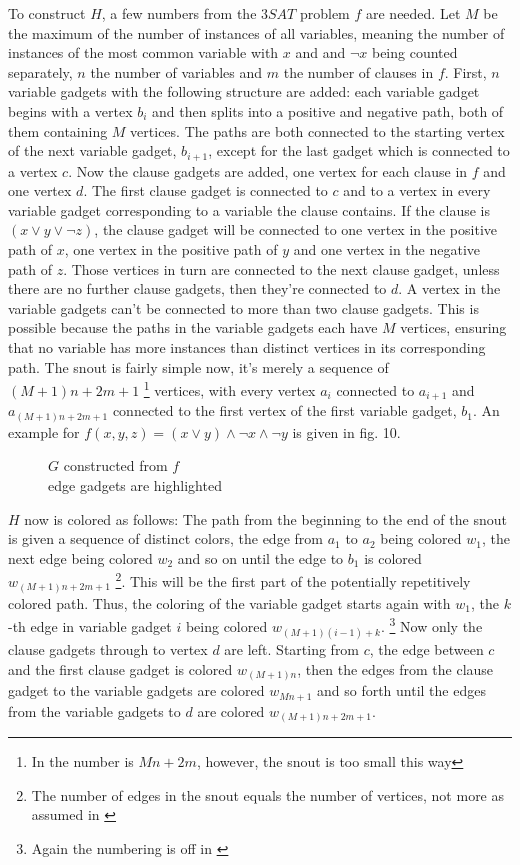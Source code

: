 \documentclass[12pt,a4paper]{article}
\begin{document}
To construct $H$, a few numbers from the $3SAT$ problem $f$ are needed. Let $M$ be the maximum of the  number of instances of all variables, meaning the number of instances of the most common variable with $x$ and and $\neg x$ being counted separately, $n$ the number of variables and $m$ the number of clauses in $f$. First, $n$ variable gadgets with the following structure are added: each variable gadget begins with a vertex $b_i$ and then splits into a positive and negative path, both of them containing $M$ vertices. The paths are both connected to the starting vertex of the next variable gadget, $b_{i+1}$, except for the last gadget which is connected to a vertex $c$. Now the clause gadgets are added, one vertex for each clause in $f$ and one vertex $d$. The first clause gadget is connected to $c$ and to a vertex in every variable gadget corresponding to a variable the clause contains. If the clause is $(x \vee y \vee \neg z)$, the clause gadget will be connected to one vertex in the positive path of $x$, one vertex in the positive path of $y$ and one vertex in the negative path of $z$. Those vertices in turn are connected to the next clause gadget, unless there are no further clause gadgets, then they're connected to $d$. A vertex in the variable gadgets can't be connected to more than two clause gadgets. This is possible because the paths in the variable gadgets each have $M$ vertices, ensuring that no variable has more instances than distinct vertices in its corresponding path. The snout is fairly simple now, it's merely a sequence of $(M+1)n+2m+1$ \footnote{In \citep{Manin2008} the number is $Mn+2m$, however, the snout is too small this way} vertices, with every vertex $a_i$ connected to $a_{i+1}$ and $a_{(M+1)n+2m+1}$ connected to the first  vertex of the first variable gadget, $b_1$. An example for $f(x, y, z) = (x \vee y) \wedge \neg x \wedge \neg y$ is given in fig. 10. 
\begin{figure}[h]
	
	\caption{$G$ constructed from $f$ \\edge gadgets are highlighted}
\end{figure}
\newline	
$H$ now is colored as follows: The path from the beginning to the end of the snout is given a sequence of distinct colors, the edge from $a_1$ to $a_2$ being colored $w_1$, the next edge being colored $w_2$ and so on until the edge to $b_1$ is colored $w_{(M+1)n+2m+1}$ \footnote{The number of edges in the snout equals the number of vertices, not more as assumed in \citep{Manin2008}}. This will be the first part of the potentially repetitively colored path. Thus, the coloring of the variable gadget starts again with $w_1$, the $k$-th edge in variable gadget $i$ being colored $w_{(M+1)(i-1)+k}$. \footnote{Again the numbering is off in \citep{Manin2008}} Now only the clause gadgets through to vertex $d$ are left. Starting from $c$, the edge between $c$ and the first clause gadget is colored $w_{(M+1)n}$, then the edges from the clause gadget to the variable gadgets are colored $w_{Mn+1}$ and so forth until the edges from the variable gadgets to $d$ are colored $w_{(M+1)n+2m+1}$. 
\end{document}
